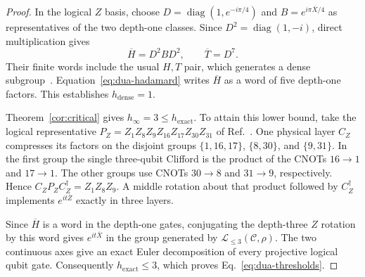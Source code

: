 \documentclass[aps,prl,reprint,notitlepage,nofootinbib,nobibnotes]{revtex4-2}
\begin{document}
\begin{proof}
In the logical \(Z\) basis, choose \(D=\operatorname{diag}(1,e^{-i\pi/4})\) and \(B=e^{i\pi\overline X/4}\) as representatives of the two depth-one classes. Since \(D^2=\operatorname{diag}(1,-i)\), direct multiplication gives
\begin{equation}\label{eq:dua-hadamard}
 \overline H=D^2BD^2,\qquad \overline T=D^7 .
\end{equation}
Their finite words include the usual \(H,T\) pair, which generates a dense subgroup~\cite{Boykin}. Equation~\eqref{eq:dua-hadamard} writes \(\overline H\) as a word of five depth-one factors. This establishes \(h_{\mathrm{dense}}=1\).

Theorem~\ref{cor:critical} gives \(h_\infty=3\le h_{\mathrm{exact}}\). To attain this lower bound, take the logical representative \(P_Z=Z_1Z_8Z_9Z_{16}Z_{17}Z_{30}Z_{31}\) of Ref.~\cite[App.~B.1, Eq.~(33)]{Dua}. One physical layer \(C_Z\) compresses its factors on the disjoint groups \(\{1,16,17\}\), \(\{8,30\}\), and \(\{9,31\}\). In the first group the single three-qubit Clifford is the product of the CNOTs \(16\to1\) and \(17\to1\). The other groups use CNOTs \(30\to8\) and \(31\to9\), respectively. Hence \(C_ZP_ZC_Z^\dagger=Z_1Z_8Z_9\). A middle rotation about that product followed by \(C_Z^\dagger\) implements \(e^{it\overline Z}\) exactly in three layers.

Since \(\overline H\) is a word in the depth-one gates, conjugating the depth-three \(Z\) rotation by this word gives \(e^{it\overline X}\) in the group generated by \(\mathcal L_{\le3}(\mathcal C,\rho)\). The two continuous axes give an exact Euler decomposition of every projective logical qubit gate. Consequently \(h_{\mathrm{exact}}\le3\), which proves Eq.~\eqref{eq:dua-thresholds}.
\end{proof}
\end{document}
